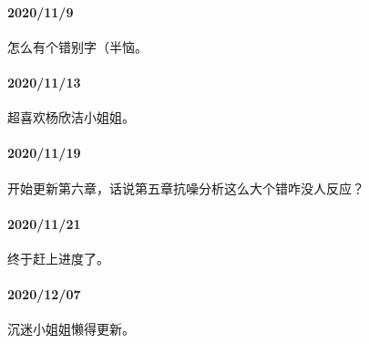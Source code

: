     \paragraph{2020/11/9}怎么有个错别字（半恼。
    \paragraph{2020/11/13}超喜欢杨欣洁小姐姐。
    \paragraph{2020/11/19}开始更新第六章，话说第五章抗噪分析这么大个错咋没人反应？
    \paragraph{2020/11/21}终于赶上进度了。
    \paragraph{2020/12/07}沉迷小姐姐懒得更新。
    